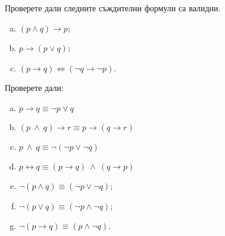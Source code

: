 
\begin{problem}
  Проверете дали следните съждителни формули са валидни.
  \begin{enumerate}[a)]
  \item
    $(p\wedge q)\rightarrow p$;
  \item
    $p\rightarrow(p\vee q)$;
  \item
    $(p\rightarrow q) \iff (\neg q \rightarrow \neg p)$.
  \end{enumerate}
\end{problem}  
\begin{problem}
  Проверете дали:
  \begin{enumerate}[a)]
  \item
    $p\rightarrow q \equiv \neg p \vee q$
  \item
    $(p\ \wedge\ q) \rightarrow r \equiv p \rightarrow (q\rightarrow r)$
  \item
    $p\ \wedge\ q \equiv \neg(\neg p \vee \neg q)$
  \item
    $p \leftrightarrow q \equiv (p\rightarrow q)\ \wedge\ (q\rightarrow p)$
  \item
    $\neg(p\wedge q) \equiv (\neg p \vee \neg q)$;
  \item
    $\neg(p\vee q) \equiv (\neg p \wedge \neg q)$;
  \item
    $\neg(p\rightarrow q) \equiv (p\wedge \neg q)$.
  \end{enumerate}
\end{problem}


